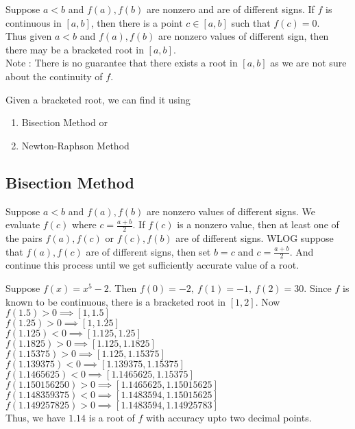 \begin{remark}
	Suppose $a <  b$ and $f(a), f(b)$ are nonzero and are of different signs.
	If $f$ is continuous in $[a,b]$, then there is a point $c \in [a,b]$ such that $f(c) = 0$.\\
	
	Thus given $a<b$ and $f(a),f(b)$ are nonzero values of different sign, then there may be a bracketed root in $[a,b]$.\\
	
	Note : There is no guarantee that there exists a root in $[a,b]$ as we are not sure about the continuity of $f$.
\end{remark}

\begin{remark}
	Given a bracketed root, we can find it using
	\begin{enumerate}
		\item Bisection Method or
		\item Newton-Raphson Method
	\end{enumerate}
\end{remark}

\subsection{Bisection Method}
	Suppose $a < b$ and $f(a),f(b)$ are nonzero values of different signs.
	We evaluate $f(c)$ where $c = \frac{a+b}{2}$.
	If $f(c)$ is a nonzero value, then at least one of the pairs $f(a),f(c)$ or $f(c),f(b)$ are of different signs.
	WLOG suppose that $f(a),f(c)$ are of different signs, then set $b = c$ and $c = \frac{a+b}{2}$.
	And continue this process until we get sufficiently accurate value of a root.

\begin{remark}
	Suppose $f(x) = x^5 - 2$.
	Then $f(0) = -2,\ f(1) = -1,\ f(2) = 30$.
	Since $f$ is known to be continuous, there is a bracketed root in $[1,2]$.
	Now $f(1.5) > 0 \implies [1,1.5]$\\
	$f(1.25) > 0 \implies [1,1.25]$\\
	$f(1.125) < 0 \implies [1.125,1.25]$\\
	$f(1.1825)>0 \implies [1.125,1.1825]$\\
	$f(1.15375)>0 \implies [1.125,1.15375]$\\
	$f(1.139375) < 0 \implies [1.139375,1.15375]$\\
	$f(1.1465625) < 0 \implies [1.1465625,1.15375]$\\
	$f(1.150156250) > 0 \implies [1.1465625,1.15015625]$\\
	$f(1.148359375) < 0 \implies [1.1483594,1.15015625]$\\
	$f(1.149257825) > 0 \implies [1.1483594,1.14925783]$\\
	
	Thus, we have $1.14$ is a root of $f$ with accuracy upto two decimal points.
\end{remark}

